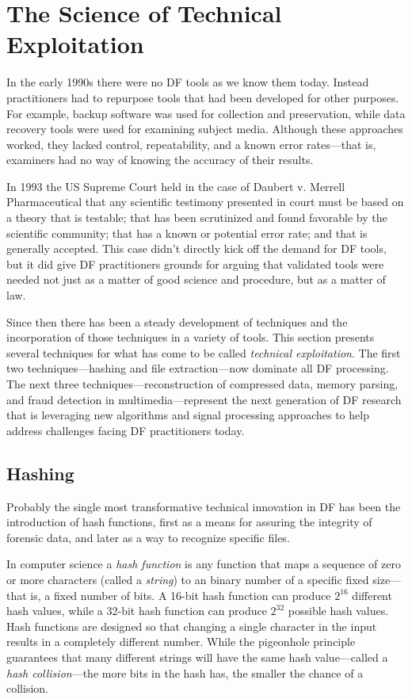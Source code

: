 \documentclass[11pt,letter]{article}
\begin{document}
\section{The Science of Technical Exploitation}

In the early 1990s there were no DF tools as we know them
today. Instead practitioners had to repurpose tools that had been
developed for other purposes. For example, backup software was
used for collection and preservation, while data recovery tools were used
for examining subject media. Although these approaches worked, they lacked control,
repeatability, and a known error rates---that is, examiners had no way
of knowing the accuracy of their results. 

In 1993 the US Supreme Court held in the case of Daubert v. Merrell
Pharmaceutical 
that any scientific testimony presented in court must be based on a theory
that is testable; that has been scrutinized and found favorable by the
scientific community; that has a known or potential error rate; and
that is generally accepted\cite{daubert}. This case didn't directly
kick off the demand for DF tools, but it did give DF practitioners
grounds for arguing that validated tools were needed not just as a matter
of good science and procedure, but as a matter of law. 

Since then there has been a steady development of techniques and the
incorporation of those techniques in a variety of tools. This section
presents several techniques for what has come to be called
\emph{technical exploitation}. The first two techniques---hashing and
file extraction---now dominate all DF processing. The next three
techniques---reconstruction of compressed data, memory parsing, and
fraud detection in multimedia---represent the next generation of DF
research that is leveraging new algorithms and signal processing
approaches to help address challenges facing DF practitioners today.

\subsection{Hashing}

Probably the single most transformative technical innovation in
DF has been the introduction of hash functions, first as a means for assuring the integrity of forensic data,
and later as a way to recognize specific files.

In computer science a \emph{hash function} is any function that maps a
sequence of zero or more characters (called a \emph{string}) to an
binary number of a specific fixed size---that is, a fixed number of
bits. A 16-bit hash
function can produce $2^{16}$ different hash values, while a
32-bit hash function can produce $2^{32}$ possible hash
values. Hash functions are designed so that changing a single
character in the input results in a completely different number. While
the pigeonhole principle guarantees that many different strings will
have the same hash value---called a \emph{hash
  collision}---the more bits in the hash has, the smaller the chance
of a collision.
\end{document}
